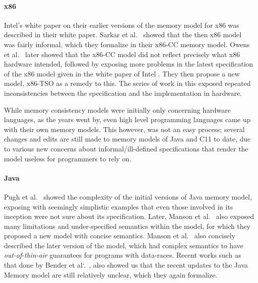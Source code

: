 \paragraph{x86}
Intel's white paper on their earlier versions of the memory model for x86 was described in their white paper\cite{IntelW}.   
Sarkar et al.~\cite{SarkarS} showed that the then x86 model was fairly informal, which they formalize in their x86-CC memory model. 
Owens et al.~\cite{OwensS} later showed that the x86-CC model did not reflect precisely what x86 hardware intended, followed by exposing more problems in the latest specification of the x86 model given in the white paper of Intel \cite{IntelW}. 
They then propose a new model, x86-TSO as a remedy to this. The series of work in this exposed repeated inconsistencies between the specification and the implementation in hardware. 

While memory consistency models were initially only concerning hardware languages, as the years went by, even high level programming languages came up with their own memory models. 
This however, was not an easy process; several changes and edits are still made to memory models of Java and C11 to date, due to various new concerns about informal/ill-defined specifications that render the model useless for programmers to rely on. 

\paragraph{Java}
Pugh et al.~\cite{Pugh} showed the complexity of the initial versions of Java memory model, exposing with seemingly simplistic examples that even those involved in its inception were not sure about its specification. 
Later, Manson et al.~\cite{JeremyM} also exposed many limitations and under-specified semantics within the model, for which they proposed a new model with concise semantics. 
Manson et al.~\cite{Manson2} also concisely described the later version of the model, which had complex semantics to have \textit{out-of-thin-air} guarantees for programs with data-races. 
Recent works such as that done by Bender et al`.~\cite{BenderJ}, also showed us that the recent updates to the Java Memory model are still relatively unclear, which they again formalize. 

